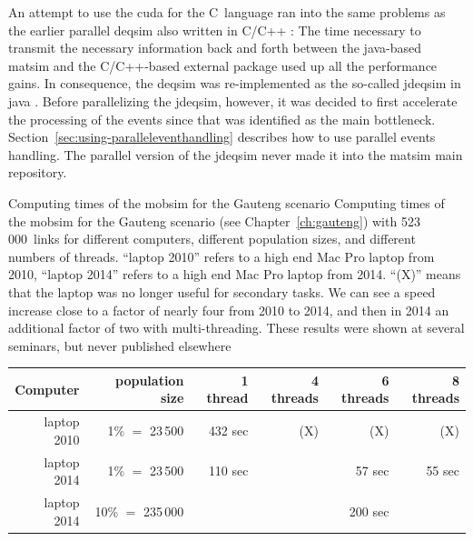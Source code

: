 An attempt to use the \gls{cuda} for the C~language \citep{StrippgenNagel2009CUDA,StrippgenNagel2009CUDA2,Strippgen2009Diss} ran into the same problems as the earlier parallel \gls{deqsim} also written in C/C++ \citep{CharyparAxhausenEtAl2007event-drivenparallelqueue-based}: The time necessary to transmit the necessary information back and forth between the \gls{java}-based \gls{matsim} and the C/C++-based external package used up all the performance gains.  In consequence, the \gls{deqsim} was re-implemented as the so-called \gls{jdeqsim} in \gls{java} \citep[][also see Section~\ref{sec:using-jdeqsim}]{WaraichEtAl_HelbichEtAl_2015}.  Before parallelizing the \gls{jdeqsim}, however, it was decided to first accelerate the processing of the events since that was identified as the main bottleneck.  Section~\ref{sec:using-paralleleventhandling} describes how to use parallel events handling.  The parallel version of the \gls{jdeqsim} \citep[][]{WaraichEtAl_HelbichEtAl_2015} never made it into the \gls{matsim} main repository.

\createtable%
{Computing times of the \gls{mobsim} for the Gauteng scenario}%
{Computing times of the \gls{mobsim} for the Gauteng scenario (see Chapter~\ref{ch:gauteng}) with 523\,000~links for different computers, different population sizes, and different numbers of threads.  ``laptop 2010'' refers to a high end Mac Pro laptop from 2010, ``laptop 2014'' refers to a high end Mac Pro laptop from 2014. ``(X)'' means that the laptop was no longer useful for secondary tasks. We can see a speed increase close to a factor of nearly four from 2010 to 2014, and then in 2014 an additional factor of two with multi-threading.  These results were shown at several seminars, but never published elsewhere}%
{\label{tab:threaded-computing-times}}%
{%
  \begin{tabular}{|r|r||r|r|r|r|}
    \hline
Computer & population size & 1 thread & 4 threads & 6 threads & 8 threads \\
\hline
\hline
laptop 2010 & 1\% $=$ 23\,500 & 432 sec & (X) & (X) & (X) \\
\hline
laptop 2014 & 1\% $=$ 23\,500 & 110 sec & & 57 sec & 55 sec \\
\hline
laptop 2014 & 10\% $=$ 235\,000 & & & 200 sec & \\
\hline
  \end{tabular}
}%
{}

